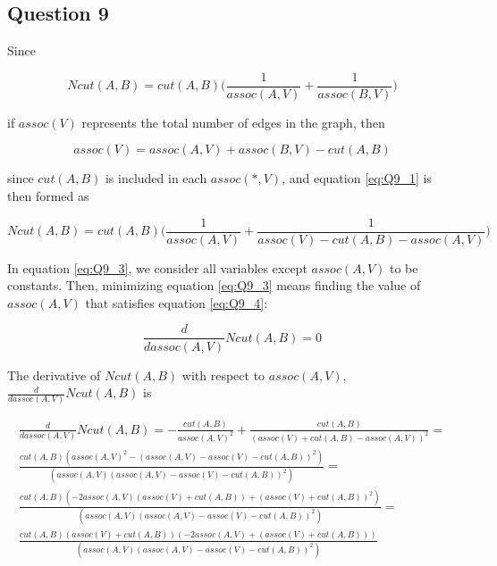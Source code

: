 \subsection{Question 9}

Since

\begin{equation}
  Ncut(A,B) = cut(A,B) \Big (\frac{1}{assoc(A,V)} + \frac{1}{assoc(B,V)} \Big)
  \label{eq:Q9_1}
\end{equation}

if $assoc(V)$ represents the total number of edges in the graph, then

\begin{equation}
  assoc(V) = assoc(A,V) + assoc(B,V) - cut(A,B)
  \label{eq:Q9_2}
\end{equation}

since $cut(A,B)$ is included in each $assoc(*,V)$, and equation \ref{eq:Q9_1}
is then formed as

\begin{equation}
  Ncut(A,B) = cut(A,B) \Big (\frac{1}{assoc(A,V)} + \frac{1}{assoc(V) - cut(A,B) - assoc(A,V)} \Big)
  \label{eq:Q9_3}
\end{equation}

In equation \ref{eq:Q9_3}, we consider all variables except $assoc(A,V)$ to be
constants. Then, minimizing equation \ref{eq:Q9_3} means finding the value of
$assoc(A,V)$ that satisfies equation \ref{eq:Q9_4}:

\begin{equation}
  \frac{d}{dassoc(A,V)}Ncut(A,B) = 0
  \label{eq:Q9_4}
\end{equation}

The derivative of $Ncut(A,B)$ with respect to $assoc(A,V)$,
$\frac{d}{dassoc(A,V)}Ncut(A,B)$ is


\begin{multline}
  \frac{d}{dassoc(A,V)}Ncut(A,B) = -\frac{cut(A,B)}{assoc(A,V)^2} +
  \frac{cut(A,B)}{(assoc(V) + cut(A,B) - assoc(A,V))^2} = \\
  \frac{cut(A,B)(assoc(A,V)^2 - (assoc(A,V) - assoc(V) - cut(A,B))^2)}{(assoc(A,V)(assoc(A,V) - assoc(V) - cut(A,B))^2)} = \\
  \frac{cut(A,B)(-2assoc(A,V)(assoc(V) + cut(A,B)) + (assoc(V) + cut(A,B))^2)}{(assoc(A,V)(assoc(A,V) - assoc(V) - cut(A,B))^2)} = \\
  \frac{cut(A,B)(assoc(V) + cut(A,B))(-2assoc(A,V) + (assoc(V) + cut(A,B)))}{(assoc(A,V)(assoc(A,V) - assoc(V) - cut(A,B))^2)}
\end{multline}

